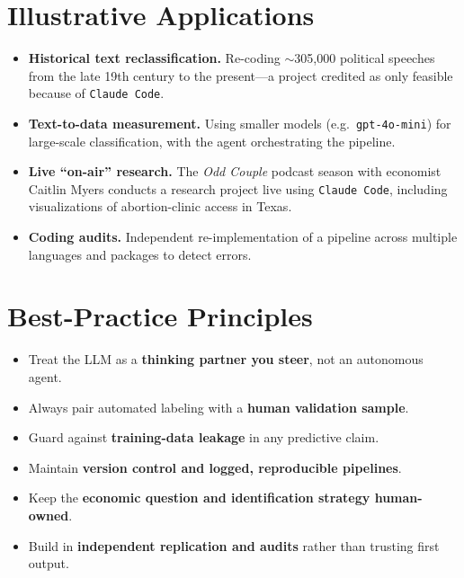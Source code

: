 \documentclass[11pt]{article}
\begin{document}
\section{Illustrative Applications}

\begin{itemize}
  \item \textbf{Historical text reclassification.} Re-coding $\sim$305,000 political
        speeches from the late 19th century to the present---a project credited as
        only feasible because of \texttt{Claude Code}.
  \item \textbf{Text-to-data measurement.} Using smaller models (e.g.\ \texttt{gpt-4o-mini})
        for large-scale classification, with the agent orchestrating the pipeline.
  \item \textbf{Live ``on-air'' research.} The \emph{Odd Couple} podcast season with
        economist Caitlin Myers conducts a research project live using \texttt{Claude
        Code}, including visualizations of abortion-clinic access in Texas.
  \item \textbf{Coding audits.} Independent re-implementation of a pipeline across
        multiple languages and packages to detect errors.
\end{itemize}

\section{Best-Practice Principles}

\begin{itemize}
  \item Treat the LLM as a \textbf{thinking partner you steer}, not an autonomous agent.
  \item Always pair automated labeling with a \textbf{human validation sample}.
  \item Guard against \textbf{training-data leakage} in any predictive claim.
  \item Maintain \textbf{version control and logged, reproducible pipelines}.
  \item Keep the \textbf{economic question and identification strategy human-owned}.
  \item Build in \textbf{independent replication and audits} rather than trusting first output.
\end{itemize}
\end{document}
